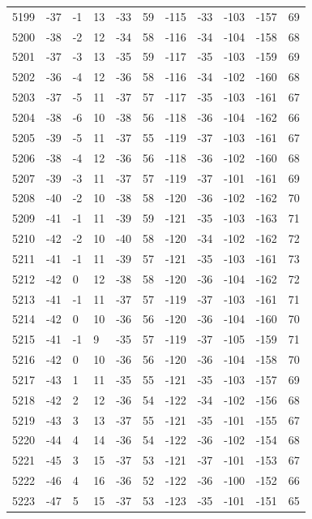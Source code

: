 \begin{table}[H]
\begin{tabular}{lllllllllll}
5199 & -37 & -1 & 13 & -33 & 59 & -115 & -33 & -103 & -157 & 69 \\
5200 & -38 & -2 & 12 & -34 & 58 & -116 & -34 & -104 & -158 & 68 \\
5201 & -37 & -3 & 13 & -35 & 59 & -117 & -35 & -103 & -159 & 69 \\
5202 & -36 & -4 & 12 & -36 & 58 & -116 & -34 & -102 & -160 & 68 \\
5203 & -37 & -5 & 11 & -37 & 57 & -117 & -35 & -103 & -161 & 67 \\
5204 & -38 & -6 & 10 & -38 & 56 & -118 & -36 & -104 & -162 & 66 \\
5205 & -39 & -5 & 11 & -37 & 55 & -119 & -37 & -103 & -161 & 67 \\
5206 & -38 & -4 & 12 & -36 & 56 & -118 & -36 & -102 & -160 & 68 \\
5207 & -39 & -3 & 11 & -37 & 57 & -119 & -37 & -101 & -161 & 69 \\
5208 & -40 & -2 & 10 & -38 & 58 & -120 & -36 & -102 & -162 & 70 \\
5209 & -41 & -1 & 11 & -39 & 59 & -121 & -35 & -103 & -163 & 71 \\
5210 & -42 & -2 & 10 & -40 & 58 & -120 & -34 & -102 & -162 & 72 \\
5211 & -41 & -1 & 11 & -39 & 57 & -121 & -35 & -103 & -161 & 73 \\
5212 & -42 & 0 & 12 & -38 & 58 & -120 & -36 & -104 & -162 & 72 \\
5213 & -41 & -1 & 11 & -37 & 57 & -119 & -37 & -103 & -161 & 71 \\
5214 & -42 & 0 & 10 & -36 & 56 & -120 & -36 & -104 & -160 & 70 \\
5215 & -41 & -1 & 9 & -35 & 57 & -119 & -37 & -105 & -159 & 71 \\
5216 & -42 & 0 & 10 & -36 & 56 & -120 & -36 & -104 & -158 & 70 \\
5217 & -43 & 1 & 11 & -35 & 55 & -121 & -35 & -103 & -157 & 69 \\
5218 & -42 & 2 & 12 & -36 & 54 & -122 & -34 & -102 & -156 & 68 \\
5219 & -43 & 3 & 13 & -37 & 55 & -121 & -35 & -101 & -155 & 67 \\
5220 & -44 & 4 & 14 & -36 & 54 & -122 & -36 & -102 & -154 & 68 \\
5221 & -45 & 3 & 15 & -37 & 53 & -121 & -37 & -101 & -153 & 67 \\
5222 & -46 & 4 & 16 & -36 & 52 & -122 & -36 & -100 & -152 & 66 \\
5223 & -47 & 5 & 15 & -37 & 53 & -123 & -35 & -101 & -151 & 65 \\

\end{tabular}
\end{table}
